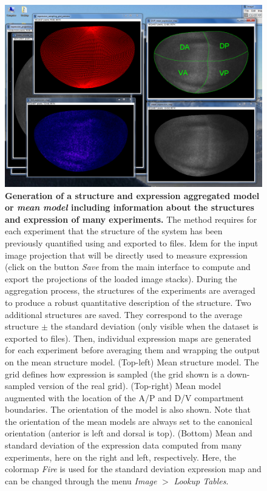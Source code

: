 \begin{figure}[!h]
\centering
\includegraphics[scale=0.42]{images/expression_agg_demo_720p_crop.jpg}
\caption{\textbf{Generation of a structure and expression aggregated model or \textit{mean model} including information about the structures and expression of many experiments.} The method requires for each experiment that the structure of the system has been previously quantified using \wingj and exported to files. Idem for the input image projection that will be directly used to measure expression (click on the button \textit{Save} from the main interface to compute and export the projections of the loaded image stacks). During the aggregation process, the structures of the experiments are averaged to produce a robust quantitative description of the structure. Two additional structures are saved. They correspond to the average structure $\pm$ the standard deviation (only visible when the dataset is exported to files). Then, individual expression maps are generated for each experiment before averaging them and wrapping the output on the mean structure model. (Top-left) Mean structure model. The grid defines how expression is sampled (the grid shown is a down-sampled version of the real grid). (Top-right) Mean model augmented with the location of the A/P and D/V compartment boundaries. The orientation of the model is also shown. Note that the orientation of the mean models are always set to the canonical orientation (anterior is left and dorsal is top). (Bottom) Mean and standard deviation of the expression data computed from many experiments, here on the right and left, respectively. Here, the \ij colormap \textit{Fire} is used for the standard deviation expression map and can be changed through the menu \textit{Image} $>$ \textit{Lookup Tables}.}
\label{fig:wingj_expression_agg_demo}
\end{figure}

